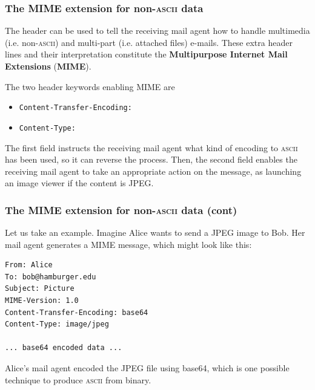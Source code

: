 %
\begin{frame}[containsverbatim]
\frametitle{The MIME extension for non-\textsc{ascii} data}

The header can be used to tell the receiving mail agent how to handle
multimedia (i.e. non-\textsc{ascii}) and multi-part (i.e. attached
files) e-mails. These extra header lines and their interpretation
constitute the \textbf{Multipurpose Internet Mail Extensions}
(\textbf{MIME}).

The two header keywords enabling MIME are
\begin{itemize}

  \item {\small \verb+Content-Transfer-Encoding:+}

  \item {\small \verb+Content-Type:+}

\end{itemize}
The first field instructs the receiving mail agent what kind of
encoding to \textsc{ascii} has been used, so it can reverse the
process. Then, the second field enables the receiving mail agent to
take an appropriate action on the message, as launching an image
viewer if the content is JPEG.

\end{frame}

%
\begin{frame}[containsverbatim]
\frametitle{The MIME extension for non-\textsc{ascii} data (cont)}

Let us take an example. Imagine Alice wants to send a JPEG image to
Bob. Her mail agent generates a MIME message, which might look like
this:
{\small
\begin{verbatim}
From: Alice
To: bob@hamburger.edu
Subject: Picture
MIME-Version: 1.0
Content-Transfer-Encoding: base64
Content-Type: image/jpeg

... base64 encoded data ...
\end{verbatim}
}
Alice's mail agent encoded the JPEG file using base64, which is one
possible technique to produce \textsc{ascii} from binary.

\end{frame}

